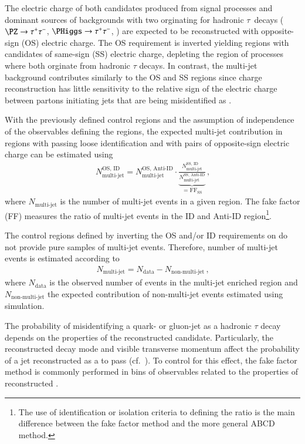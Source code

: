 The electric charge of both \tauhadvis candidates produced from signal
processes and dominant sources of backgrounds with two \tauhadvis
orginating for hadronic $\tau$~decays ($\PZ \to \tautau$,
$\PHiggs \to \tautau$, \ttbar) are expected to be reconstructed with
opposite-sign (OS) electric charge. The OS requirement is inverted
yielding regions with \tauhadvis candidates of same-sign (SS) electric
charge, depleting the region of processes where both \tauhadvis
orginate from hadronic $\tau$ decays. In contrast, the multi-jet
background contributes similarly to the OS and SS regions since
\tauhadvis charge reconstruction has little sensitivity to the
relative sign of the electric charge between partons initiating jets
that are being misidentified as \tauhadvis.

With the previously defined control regions and the assumption of
independence of the observables defining the regions, the expected
multi-jet contribution in regions with \tauhadvis passing loose
identification and with \tauhadvis pairs of opposite-sign electric
charge can be estimated using
\begin{align*}
  N_\text{multi-jet}^{\text{OS, ID}} =
  N_\text{multi-jet}^{\text{OS, Anti-ID}}
  \cdot
  \underbrace{\frac{N_\text{multi-jet}^{\text{SS, ID}}}
  {N_\text{multi-jet}^{\text{SS, Anti-ID}}}}
  _{= \text{FF}_\text{SS}} \,\text{,}
\end{align*}
where $N_\text{multi-jet}$ is the number of multi-jet events in a
given region. The fake factor (FF) measures the ratio of multi-jet
events in the ID and Anti-ID region\footnote{The use of identification
  or isolation criteria to defining the ratio is the main difference
  between the fake factor method and the more general ABCD method.}.

The control regions defined by inverting the OS and/or ID requirements on
\tauhadvis do not provide pure samples of multi-jet events. Therefore,
number of multi-jet events is estimated according to
\begin{align*}
  N_\text{multi-jet} = N_\text{data} - N_\text{non-multi-jet} \,\text{,}
\end{align*}
where $N_\text{data}$ is the observed number of events in the
multi-jet enriched region and $N_\text{non-multi-jet}$ the expected
contribution of non-multi-jet events estimated using simulation.

The probability of misidentifying a quark- or gluon-jet as a hadronic
$\tau$ decay depends on the properties of the reconstructed \tauhadvis
candidate. Particularly, the reconstructed decay mode and visible
transverse momentum affect the probability of a jet reconstructed as a
\tauhadvis to pass \tauid (cf.\ ). To control for this
effect, the fake factor method is commonly performed in bins of
observables related to the properties of reconstructed \tauhadvis.

